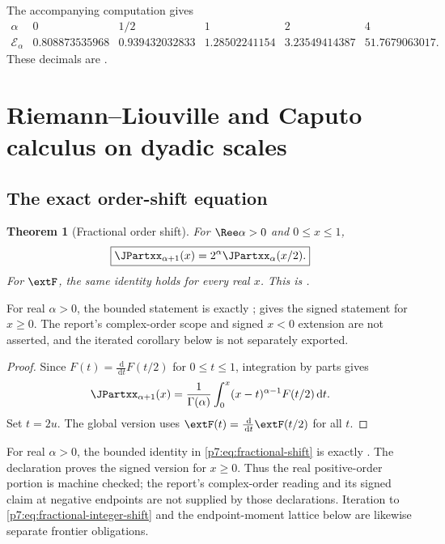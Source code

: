 \documentclass[11pt,oneside]{article}
\newtheorem{theorem}{Theorem}[section]
\theoremstyle{definition}
\theoremstyle{remark}
\newcommand{\dd}{\,\mathrm d}
\newcommand{\1}{\mathbf 1}
\begin{document}
The accompanying computation gives
\begin{equation}
\begin{array}{c|ccccc}
 \alpha&0&1/2&1&2&4\\ \hline
 \mathcal E_\alpha
 &0.808873535968&0.939432032833&1.28502241154&3.23549414387&51.7679063017.
\end{array}
\label{p7:eq:energy-numerics}
\end{equation}
These decimals are \statusnumeric.

\section{Riemann--Liouville and Caputo calculus on dyadic scales}
\label{p7:sec:fractional}

\subsection{The exact order-shift equation}

\begin{theorem}[Fractional order shift]
\label{p7:thm:fractional-shift}
For $\Ree\alpha>0$ and $0\le x\le1$,
\begin{equation}
 \boxed{\JPartxx_{\alpha+1}(x)=2^\alpha\JPartxx_\alpha(x/2).}
 \label{p7:eq:fractional-shift}
\end{equation}
For $\extF$, the same identity holds for every real $x$.  This is \statusproved.
\end{theorem}

For real \(\alpha>0\), the bounded statement is exactly
;
 gives the signed statement
for \(x\ge0\).  The report's complex-order scope and signed \(x<0\) extension are not
asserted, and the iterated corollary below is not separately exported.

\begin{proof}
Since $F(t)=\frac{\dd}{\dd t}F(t/2)$ for $0\le t\le1$, integration by parts gives
\[
 \JPartxx_{\alpha+1}(x)
 =\frac1{\Gamma(\alpha)}\int_0^x(x-t)^{\alpha-1}F(t/2)\dd t.
\]
Set $t=2u$.  The global version uses
$\extF(t)=\frac{\dd}{\dd t}\extF(t/2)$ for all $t$.
\end{proof}

\begin{remark}
For real \(\alpha>0\), the bounded identity in
\eqref{p7:eq:fractional-shift} is exactly
.  The declaration
 proves the signed version
for $x\ge0$.  Thus the real positive-order portion is machine checked; the report's
complex-order reading and its signed claim at negative endpoints are not supplied by those
declarations.  Iteration to \eqref{p7:eq:fractional-integer-shift} and the endpoint-moment
lattice below are likewise separate frontier obligations.
\end{remark}
\end{document}
